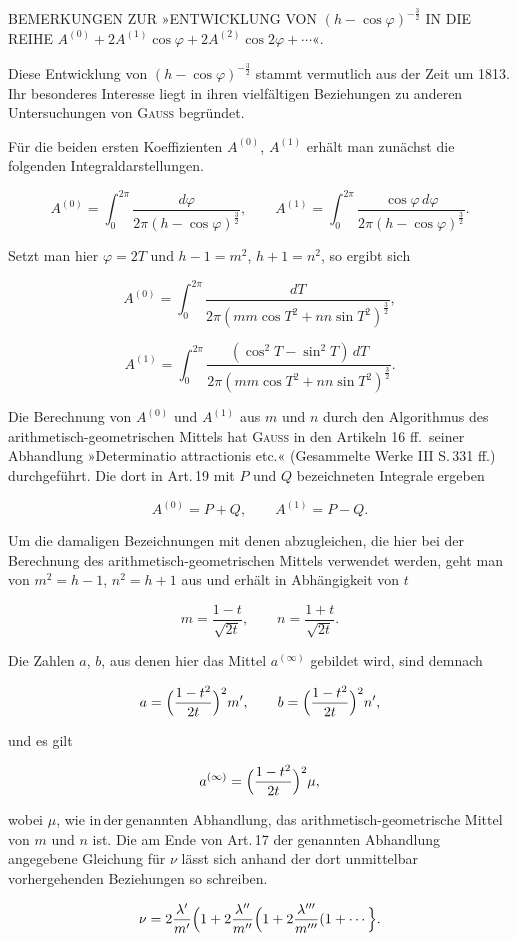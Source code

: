 %

\begin{center}
BEMERKUNGEN ZUR »ENTWICKLUNG VON $(h-\cos\varphi)^{-\frac{3}{2}}$
IN DIE REIHE $A^{(0)}+2A^{(1)}\cos\varphi+2A^{(2)}\cos2\varphi+\cdots$«.
\end{center}

Diese Entwicklung von $(h-\cos\varphi)^{-\frac{3}{2}}$ stammt vermutlich aus der Zeit um
1813. Ihr besonderes Interesse liegt in ihren vielfältigen Beziehungen zu anderen
Untersuchungen von \textsc{Gauss} begründet.

Für die beiden ersten Koeffizienten $A^{(0)}$, $A^{(1)}$ erhält man
zunächst die folgenden Integraldarstellungen.

\[
A^{(0)}=\int_{0}^{2\pi}\frac{d\varphi}{2\pi(h-\cos\varphi)^{\frac{3}{2}}},\qquad
A^{(1)}=\int_{0}^{2\pi}\frac{\cos\varphi\,d\varphi}{2\pi(h-\cos\varphi)^{\frac{3}{2}}}.
\]

\noindent Setzt man hier $\varphi=2T$ und $h-1=m^{2}$, $h+1=n^{2}$, so ergibt sich

\[
A^{(0)}=\int_{0}^{2\pi}\frac{dT}{2\pi(mm\cos T^{2}+nn\sin T^{2})^{\frac{3}{2}}},
\]

\[
A^{(1)}=\int_{0}^{2\pi}\frac{(\cos^{2}T-\sin^{2}T)\,dT}{2\pi(mm\cos T^{2}+nn\sin T^{2})^{\frac{3}{2}}}.
\]

\noindent Die Berechnung von $A^{(0)}$ und $A^{(1)}$ aus $m$ und $n$ durch den
Algorithmus des arithmetisch-geometrischen Mittels hat \textsc{Gauss} in den Artikeln 16 ff.\
seiner Abhandlung »Determinatio attractionis etc.« (Gesammelte Werke III S.\,331 ff.)
durchgeführt. Die dort in Art.\,19 mit $P$ und $Q$ bezeichneten Integrale ergeben

\[
A^{(0)}=P+Q,\qquad A^{(1)}=P-Q.
\]

\noindent Um die damaligen Bezeichnungen mit denen abzugleichen, die hier bei der Berechnung des
arithmetisch-geometrischen Mittels verwendet werden, geht man
von $m^{2}=h-1$, $n^{2}=h+1$ aus und erhält in Abhängigkeit von $t$

\[
m=\frac{1-t}{\sqrt{2t}},\qquad n=\frac{1+t}{\sqrt{2t}}.
\]

\noindent Die Zahlen $a$, $b$, aus denen hier das Mittel $a^{(\infty)}$ gebildet wird, sind
demnach

\[
a=\Bigl(\frac{1-t^{2}}{2t}\Bigr)^{2}m',\qquad b=\Bigl(\frac{1-t^{2}}{2t}\Bigr)^{2}n',
\]

\noindent und es gilt

\[
a^{(\infty)}=\Bigl(\frac{1-t^{2}}{2t}\Bigr)^{2}\mu,
\]

\noindent wobei $\mu$, wie in\,der\,genannten Abhandlung, das arithmetisch-geometrische Mittel von $m$ und $n$ ist.
Die am Ende von Art.\,17 der genannten Abhandlung angegebene Gleichung für $\nu$
lässt sich anhand der dort unmittelbar vorhergehenden Beziehungen so schreiben.

\[
\nu=2\frac{\lambda'}{m'}\Bigl(1+2\frac{\lambda''}{m''}\Bigl(1+2\frac{\lambda'''}{m'''}(1+\cdots\Bigr\}.
\]
